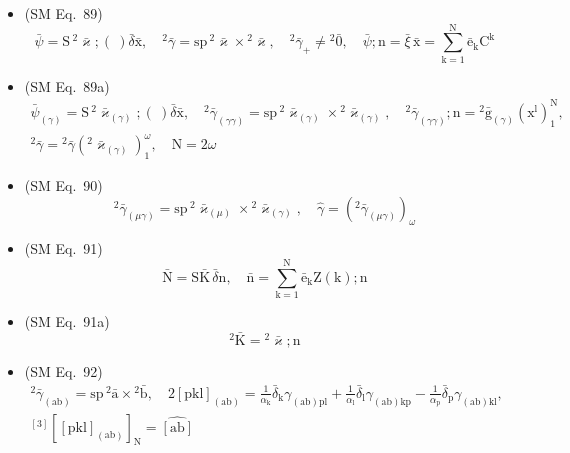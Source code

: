 \documentclass[
    12pt,              %
    a4paper,           %
    headings=normal,   %
    twoside=true,      %
    BCOR=8mm,          %
]{scrbook}
\begin{document}
\begin{itemize}[label={},leftmargin=0pt]
    \item (SM Eq.\ 89) 
    \[
    \bar{\psi} = \mathrm{S}\,{}^2\bar{\varkappa};(\ )\bar{\delta}\bar{\mathrm{x}}, \quad {}^2\bar{\gamma} = \mathrm{sp}\,{}^2\bar{\varkappa} \times {}^2\bar{\varkappa}, \quad {}^2\bar{\gamma}_+ \ne {}^2\bar{0}, \quad \bar{\psi};\mathrm{n} = \bar{\xi}\,\bar{\mathrm{x}} = \sum_{\mathrm{k}=1}^\mathrm{N} \bar{\mathrm{e}}_\mathrm{k} \mathrm{C^k}
    \]

    \item (SM Eq.\ 89a) 
    \[
    \begin{gathered}
    \bar{\psi}_{(\gamma)} = \mathrm{S}\,{}^2\bar{\varkappa}_{(\gamma)};(\ )\bar{\delta}\bar{\mathrm{x}}, \quad {}^2\bar{\gamma}_{(\gamma\gamma)} = \mathrm{sp}\,{}^2\bar{\varkappa}_{(\gamma)} \times {}^2\bar{\varkappa}_{(\gamma)}, \quad {}^2\bar{\gamma}_{(\gamma\gamma)};\mathrm{n} = {}^2\bar{\mathrm{g}}_{(\gamma)} \left( \mathrm{x^l} \right)_1^\mathrm{N}, \\
    {}^2\bar{\gamma} = {}^2\bar{\gamma}\left({}^2\bar{\varkappa}_{(\gamma)}\right)_1^\omega, \quad \mathrm{N} = 2\omega
    \end{gathered}
    \]

    \item (SM Eq.\ 90) 
    \[
    {}^2\bar{\gamma}_{(\mu\gamma)} = \mathrm{sp}\,{}^2\bar{\varkappa}_{(\mu)} \times {}^2\bar{\varkappa}_{(\gamma)}, \quad \hat{\gamma} = \left( {}^2\bar{\gamma}_{(\mu\gamma)} \right)_\omega
    \]

    \item (SM Eq.\ 91) 
    \[
    \bar{\mathrm{N}} = \mathrm{S}\bar{\mathrm{K}}\,\bar{\delta}\mathrm{n}, \quad \bar{\mathrm{n}} = \sum_{\mathrm{k}=1}^\mathrm{N} \bar{\mathrm{e}}_\mathrm{k} \mathrm{Z}(\mathrm{k});\mathrm{n}
    \]

    \item (SM Eq.\ 91a) 
    \[
    {}^2\bar{\mathrm{K}} = {}^2\bar{\varkappa};\mathrm{n}
    \]

    \item (SM Eq.\ 92) 
    \[
    \begin{gathered}
    {}^2\bar{\gamma}_{(\mathrm{ab})} = \mathrm{sp}\,{}^2\bar{\mathrm{a}} \times {}^2\bar{\mathrm{b}}, \quad 2\left[\mathrm{pkl}\right]_{(\mathrm{ab})} = \frac{1}{\alpha_\mathrm{k}}\bar{\delta}_\mathrm{k} \gamma_{(\mathrm{ab})\mathrm{pl}} + \frac{1}{\alpha_\mathrm{l}}\bar{\delta}_\mathrm{l} \gamma_{(\mathrm{ab})\mathrm{kp}} - \frac{1}{\alpha_\mathrm{p}}\bar{\delta}_\mathrm{p} \gamma_{(\mathrm{ab})\mathrm{kl}}, \\
    {}^{[3]}\left[ \left[ \mathrm{pkl} \right]_{(\mathrm{ab})} \right]_\mathrm{N} = \widehat{\left[ \mathrm{ab} \right]}
    \end{gathered}
    \]


\end{itemize}
\end{document}
